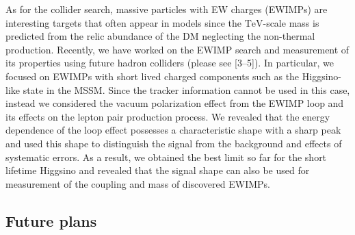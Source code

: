 \documentclass[12pt,notitlepage]{book}
\def\rem#1{ {\bf\textcolor{red}{($\clubsuit$ #1 $\clubsuit$)}}}
\begin{document}
As for the collider search, massive particles with EW charges (EWIMPs) are interesting targets that often appear in models since the $\mathrm{TeV}$-scale mass is predicted from the relic abundance of the DM neglecting the non-thermal production.
Recently, we have worked on the EWIMP search and measurement of its properties using future hadron colliders (please see [3--5]).
In particular, we focused on EWIMPs with short lived charged components such as the Higgsino-like state in the MSSM.
Since the tracker information cannot be used in this case, instead we considered the vacuum polarization effect from the EWIMP loop and its effects on the lepton pair production process.
We revealed that the energy dependence of the loop effect possesses a characteristic shape with a sharp peak and used this shape to distinguish the signal from the background and effects of systematic errors.
As a result, we obtained the best limit so far for the short lifetime Higgsino and revealed that the signal shape can also be used for measurement of the coupling and mass of discovered EWIMPs.





\vspace*{-2mm}
\subsection*{Future plans}
\end{document}

